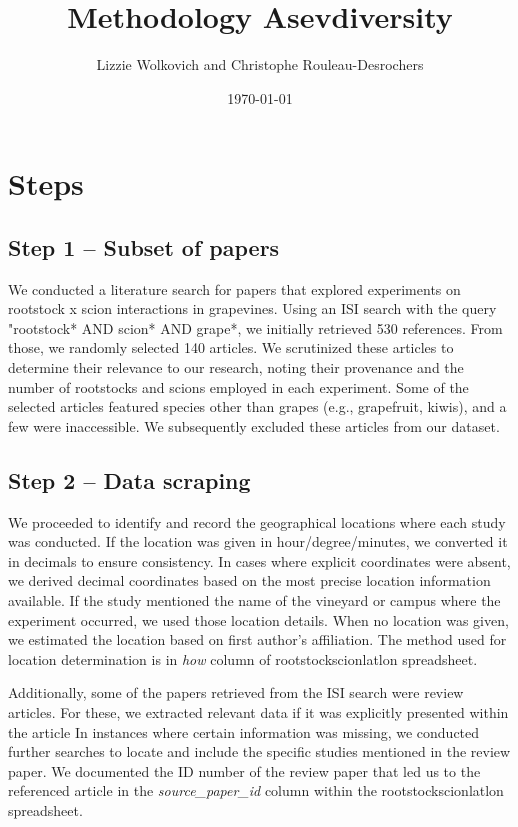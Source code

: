 \documentclass[11pt, oneside]{article}   	%
\title{Methodology Asevdiversity}
\author{Lizzie Wolkovich and Christophe Rouleau-Desrochers}
\date{\today}
\begin{document}
\maketitle
\section{Steps}
\subsection{Step 1 – Subset of papers}
We conducted a literature search for papers that explored experiments on rootstock x scion interactions in grapevines. Using an ISI search with the query "rootstock* AND scion* AND grape*, we initially retrieved 530 references. From those, we randomly selected 140 articles. We scrutinized these articles to determine their relevance to our research, noting their provenance and the number of rootstocks and scions employed in each experiment. Some of the selected articles featured species other than grapes (e.g., grapefruit, kiwis), and a few were inaccessible. We subsequently excluded these articles from our dataset.

\subsection{Step 2 – Data scraping}

We proceeded to identify and record the geographical locations where each study was conducted. If the location was given in hour/degree/minutes, we converted it in decimals to ensure consistency. In cases where explicit coordinates were absent, we derived decimal coordinates based on the most precise location information available. If the study mentioned the name of the vineyard or campus where the experiment occurred, we used those location details. When no location was given, we estimated the location based on first author’s affiliation. The method used for location determination is in \emph{how} column of rootstockscionlatlon spreadsheet. 

Additionally, some of the papers retrieved from the ISI search were review articles. For these, we extracted relevant data if it was explicitly presented within the article In instances where certain information was missing, we conducted further searches to locate and include the specific studies mentioned in the review paper. We documented the ID number of the review paper that led us to the referenced article in the \emph{source\_paper\_id} column within the rootstockscionlatlon spreadsheet.
\end{document}
